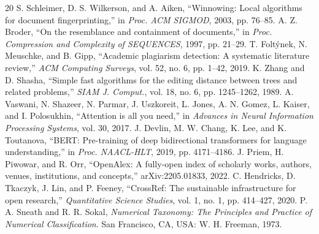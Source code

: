 \documentclass[conference]{IEEEtran}
\begin{document}
\begin{thebibliography}{20}
S. Schleimer, D. S. Wilkerson, and A. Aiken, ``Winnowing: Local algorithms for document fingerprinting,'' in \textit{Proc. ACM SIGMOD}, 2003, pp. 76--85.
A. Z. Broder, ``On the resemblance and containment of documents,'' in \textit{Proc. Compression and Complexity of SEQUENCES}, 1997, pp. 21--29.
T. Folt\'ynek, N. Meuschke, and B. Gipp, ``Academic plagiarism detection: A systematic literature review,'' \textit{ACM Computing Surveys}, vol. 52, no. 6, pp. 1--42, 2019.
K. Zhang and D. Shasha, ``Simple fast algorithms for the editing distance between trees and related problems,'' \textit{SIAM J. Comput.}, vol. 18, no. 6, pp. 1245--1262, 1989.
A. Vaswani, N. Shazeer, N. Parmar, J. Uszkoreit, L. Jones, A. N. Gomez, L. Kaiser, and I. Polosukhin, ``Attention is all you need,'' in \textit{Advances in Neural Information Processing Systems}, vol. 30, 2017.
J. Devlin, M. W. Chang, K. Lee, and K. Toutanova, ``BERT: Pre-training of deep bidirectional transformers for language understanding,'' in \textit{Proc. NAACL-HLT}, 2019, pp. 4171--4186.
J. Priem, H. Piwowar, and R. Orr, ``OpenAlex: A fully-open index of scholarly works, authors, venues, institutions, and concepts,'' arXiv:2205.01833, 2022.
C. Hendricks, D. Tkaczyk, J. Lin, and P. Feeney, ``CrossRef: The sustainable infrastructure for open research,'' \textit{Quantitative Science Studies}, vol. 1, no. 1, pp. 414--427, 2020.
P. A. Sneath and R. R. Sokal, \textit{Numerical Taxonomy: The Principles and Practice of Numerical Classification}. San Francisco, CA, USA: W. H. Freeman, 1973.
\end{thebibliography}
\end{document}
